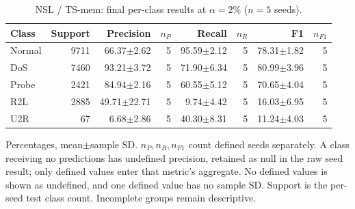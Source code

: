 \begin{table}[t]
\centering\scriptsize
\setlength{\tabcolsep}{3.3pt}
\caption{NSL / TS-mem: final per-class results at $\alpha=2\%$ ($n=5$ seeds).}\label{tab:forgetting-class-nsl_kdd-ts-mem}
\begin{tabular}{lrrrrrrr}
\toprule
Class & Support & Precision & $n_P$ & Recall & $n_R$ & F1 & $n_{F1}$ \\
\midrule
Normal & 9711 & 66.37$\pm$2.62 & 5 & 95.59$\pm$2.12 & 5 & 78.31$\pm$1.82 & 5 \\
DoS & 7460 & 93.21$\pm$3.72 & 5 & 71.90$\pm$6.34 & 5 & 80.99$\pm$3.96 & 5 \\
Probe & 2421 & 84.94$\pm$2.16 & 5 & 60.55$\pm$5.12 & 5 & 70.65$\pm$4.04 & 5 \\
R2L & 2885 & 49.71$\pm$22.71 & 5 & 9.74$\pm$4.42 & 5 & 16.03$\pm$6.95 & 5 \\
U2R & 67 & 6.68$\pm$2.86 & 5 & 40.30$\pm$8.31 & 5 & 11.24$\pm$4.03 & 5 \\
\bottomrule
\end{tabular}
\par\smallskip\begin{minipage}{0.98\textwidth}\scriptsize Percentages, mean$\pm$sample SD. $n_P,n_R,n_{F1}$ count defined seeds separately. A class receiving no predictions has undefined precision, retained as null in the raw seed result; only defined values enter that metric's aggregate. No defined values is shown as undefined, and one defined value has no sample SD. Support is the per-seed test class count. Incomplete groups remain descriptive.\end{minipage}
\end{table}

